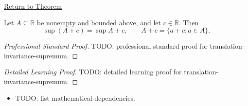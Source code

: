 \newpage
{}
\label{prf:translation-invariance-supremum}

\begin{remark*}[Return]
\hyperref[thm:translation-invariance-supremum]{Return to Theorem}
\end{remark*}

\begin{theorem*}
Let $A\subseteq\mathbb{R}$ be nonempty and bounded above, and let $c\in\mathbb{R}$. Then
\[
  \sup(A+c)=\sup A+c,
  \qquad
  A+c=\{a+c:a\in A\}.
\]
\end{theorem*}

\begin{proof}[Professional Standard Proof]
\LRAProofBodyStart
TODO: professional standard proof for translation-invariance-supremum.
\end{proof}

\begin{proof}[Detailed Learning Proof]
\LRAProofBodyStart
TODO: detailed learning proof for translation-invariance-supremum.
\end{proof}

\begin{remark*}
\end{remark*}

\begin{dependencies}
\begin{itemize}
  \item TODO: list mathematical dependencies.
\end{itemize}
\end{dependencies}

\clearpage
